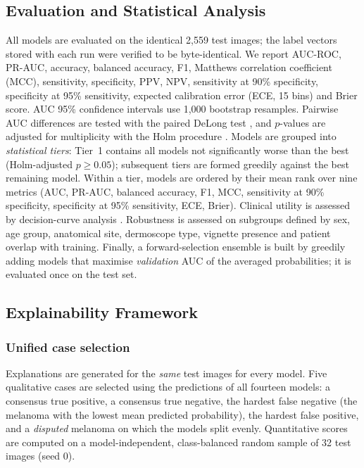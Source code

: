 \documentclass[journal]{IEEEtran}
\begin{document}
\subsection{Evaluation and Statistical Analysis}
All models are evaluated on the identical 2,559 test images; the label vectors stored with each run were verified to be byte-identical. We report AUC-ROC, PR-AUC, accuracy, balanced accuracy, F1, Matthews correlation coefficient (MCC), sensitivity, specificity, PPV, NPV, sensitivity at 90\% specificity, specificity at 95\% sensitivity, expected calibration error (ECE, 15 bins) and Brier score. AUC 95\% confidence intervals use 1,000 bootstrap resamples. Pairwise AUC differences are tested with the paired DeLong test \cite{delong1988}, and $p$-values are adjusted for multiplicity with the Holm procedure \cite{holm1979}. Models are grouped into \emph{statistical tiers}: Tier~1 contains all models not significantly worse than the best (Holm-adjusted $p\ge0.05$); subsequent tiers are formed greedily against the best remaining model. Within a tier, models are ordered by their mean rank over nine metrics (AUC, PR-AUC, balanced accuracy, F1, MCC, sensitivity at 90\% specificity, specificity at 95\% sensitivity, ECE, Brier). Clinical utility is assessed by decision-curve analysis \cite{vickers2006}. Robustness is assessed on subgroups defined by sex, age group, anatomical site, dermoscope type, vignette presence and patient overlap with training. Finally, a forward-selection ensemble is built by greedily adding models that maximise \emph{validation} AUC of the averaged probabilities; it is evaluated once on the test set.

\subsection{Explainability Framework}
\subsubsection{Unified case selection}
Explanations are generated for the \emph{same} test images for every model. Five qualitative cases are selected using the predictions of all fourteen models: a consensus true positive, a consensus true negative, the hardest false negative (the melanoma with the lowest mean predicted probability), the hardest false positive, and a \emph{disputed} melanoma on which the models split evenly. Quantitative scores are computed on a model-independent, class-balanced random sample of 32 test images (seed 0).
\end{document}
